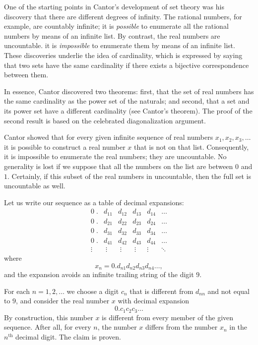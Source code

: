 \documentclass[12pt]{article}
\begin{document}
 One of the starting points in
Cantor's development of set theory was his discovery that there are
different degrees of infinity.  The rational numbers, for example, are
countably infinite; it is \emph{possible} to enumerate all the rational
numbers by means of an infinite list.  By contrast, the real numbers
are uncountable. it is \emph{impossible} to enumerate them by means of an
infinite list.  These discoveries underlie the idea of cardinality,
which is expressed by saying that two sets have the same cardinality
if there exists a bijective correspondence between them.   

In essence, Cantor discovered two theorems: first, that the set of
real numbers has the same cardinality as the power set of the
naturals; and second, that a set and its power set have a different
cardinality (see Cantor's theorem).  The proof of the second result
is based on the celebrated diagonalization argument.

Cantor showed that for every given infinite sequence of real numbers
$x_1, x_2, x_3, \ldots$ it is possible to construct a real number $x$
that is not on that list.  Consequently, it is impossible to enumerate
the real numbers; they are uncountable.  No generality is lost if we
suppose that all the numbers on the list are between $0$ and $1$.
Certainly, if this subset of the real numbers in uncountable, then the
full set is uncountable as well.  

Let us write our sequence as a table of decimal expansions:
$$
\begin{array}{rlllll}
0\;.&d_{11}&d_{12}&d_{13}&d_{14}&\ldots\\
0\;.&d_{21}&d_{22}&d_{23}&d_{24}&\ldots\\
0\;.&d_{31}&d_{32}&d_{33}&d_{34}&\ldots\\
0\;.&d_{41}&d_{42}&d_{43}&d_{44}&\ldots\\
\vdots\; & \;\vdots&\;\vdots&\;\vdots\;&\vdots&\ddots
\end{array}
$$
where
$$x_n = 0.d_{n1} d_{n2} d_{n3} d_{n4}\ldots,$$
and the expansion avoids an infinite trailing string of
the digit $9$.

For each $n=1,2,\ldots$ we choose a digit $c_n$ that is different from
$d_{nn}$ and not equal to $9$, and consider  the real number $x$ with
decimal expansion
$$0.c_1c_2c_3\ldots$$
By construction, this number $x$ is different from every member of the
given sequence.  After all, for every $n$, the number $x$ differs from
the number $x_n$ in the $n^{\scriptscriptstyle \text{th}}$ decimal
digit.
The claim is proven.
\end{document}
